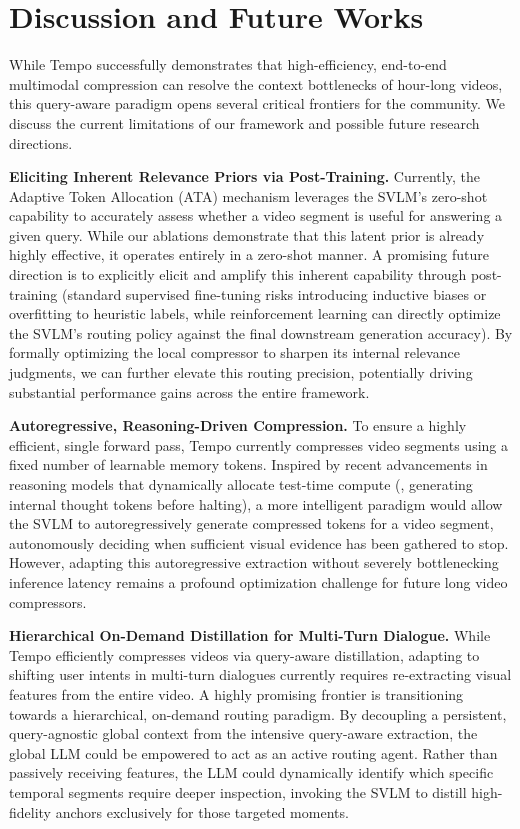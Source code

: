 \section{Discussion and Future Works}
\label{sec:Discussion}

While Tempo successfully demonstrates that high-efficiency, end-to-end multimodal compression can resolve the context bottlenecks of hour-long videos, this query-aware paradigm opens several critical frontiers for the community. We discuss the current limitations of our framework and possible future research directions.

\vspace{1mm}
\noindent \textbf{Eliciting Inherent Relevance Priors via Post-Training.} 
Currently, the Adaptive Token Allocation (ATA) mechanism leverages the SVLM's zero-shot capability to accurately assess whether a video segment is useful for answering a given query. While our ablations demonstrate that this latent prior is already highly effective, it operates entirely in a zero-shot manner. A promising future direction is to explicitly elicit and amplify this inherent capability through post-training (standard supervised fine-tuning risks introducing inductive biases or overfitting to heuristic labels, while reinforcement learning can directly optimize the SVLM's routing policy against the final downstream generation accuracy). By formally optimizing the local compressor to sharpen its internal relevance judgments, we can further elevate this routing precision, potentially driving substantial performance gains across the entire framework.

\vspace{1mm}
\noindent \textbf{Autoregressive, Reasoning-Driven Compression.} 
To ensure a highly efficient, single forward pass, Tempo currently compresses video segments using a fixed number of learnable memory tokens. Inspired by recent advancements in reasoning models that dynamically allocate test-time compute (\eg, generating internal thought tokens before halting), a more intelligent paradigm would allow the SVLM to autoregressively generate compressed tokens for a video segment, autonomously deciding when sufficient visual evidence has been gathered to stop. However, adapting this autoregressive extraction without severely bottlenecking inference latency remains a profound optimization challenge for future long video compressors.

\vspace{1mm}
\noindent \textbf{Hierarchical On-Demand Distillation for Multi-Turn Dialogue.} 
While Tempo efficiently compresses videos via query-aware distillation, adapting to shifting user intents in multi-turn dialogues currently requires re-extracting visual features from the entire video. A highly promising frontier is transitioning towards a hierarchical, on-demand routing paradigm. By decoupling a persistent, query-agnostic global context from the intensive query-aware extraction, the global LLM could be empowered to act as an active routing agent. Rather than passively receiving features, the LLM could dynamically identify which specific temporal segments require deeper inspection, invoking the SVLM to distill high-fidelity anchors exclusively for those targeted moments.